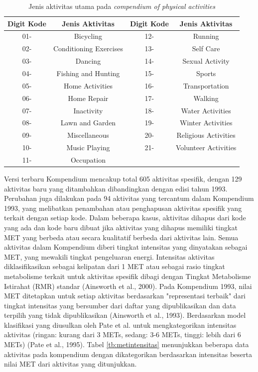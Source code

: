 \begin{longtable}{|c|c|c|c|}
  \caption{Jenis aktivitas utama pada \emph{compendium of physical activities}}
  \label{tb:metjenisaktivitas}  \\
  \hline
  \rowcolor[HTML]{C0C0C0}
  \textbf{Digit Kode} & \textbf{Jenis Aktivitas} & \textbf{Digit Kode} & \textbf{Jenis Aktivitas} \\
  \hline
  01-     & Bicycling                 & 12-    & Running     \\
  \hline
  02-     & Conditioning Exercises    & 13-    & Self Care     \\
  \hline
  03-     & Dancing                   & 14-    & Sexual Activity     \\
  \hline
  04-     & Fishing and Hunting       & 15-    & Sports    \\
  \hline
  05-     & Home Activities           & 16-    & Transportation     \\
  \hline
  06-     & Home Repair               & 17-    & Walking    \\
  \hline
  07-     & Inactivity                & 18-    & Water Activities    \\
  \hline
  08-     & Lawn and Garden           & 19-    & Winter Activities    \\
  \hline
  09-     & Miscellaneous             & 20-    & Religious Activities    \\
  \hline
  10-     & Music Playing             & 21-    & Volunteer Activities    \\
  \hline
  11-     & Occupation                &        &     \\
  \hline
\end{longtable}

Versi terbaru Kompendium mencakup total 605 aktivitas spesifik, dengan 129 aktivitas baru yang ditambahkan dibandingkan dengan edisi tahun 1993. Perubahan juga dilakukan pada 94 aktivitas yang tercantum dalam Kompendium 1993, yang melibatkan penambahan atau penghapusan aktivitas spesifik yang terkait dengan setiap kode. Dalam beberapa kasus, aktivitas dihapus dari kode yang ada dan kode baru dibuat jika aktivitas yang dihapus memiliki tingkat MET yang berbeda atau secara kualitatif berbeda dari aktivitas lain. Semua aktivitas dalam Kompendium diberi tingkat intensitas yang dinyatakan sebagai MET, yang mewakili tingkat pengeluaran energi. Intensitas aktivitas diklasifikasikan sebagai kelipatan dari 1 MET atau sebagai rasio tingkat metabolisme terkait untuk aktivitas spesifik dibagi dengan Tingkat Metabolisme Istirahat (RMR) standar (Ainsworth et al., 2000). Pada Kompendium 1993, nilai MET ditetapkan untuk setiap aktivitas berdasarkan "representasi terbaik" dari tingkat intensitas yang bersumber dari daftar yang dipublikasikan dan data terpilih yang tidak dipublikasikan (Ainsworth et al., 1993).  Berdasarkan model klasifikasi yang diusulkan oleh Pate et al. untuk mengkategorikan intensitas aktivitas (ringan: kurang dari 3 METs, sedang: 3-6 METs, tinggi: lebih dari 6 METs) (Pate et al., 1995). Tabel \ref{tb:metintensitas} menunjukkan beberapa data aktivitas pada kompendium dengan dikategorikan berdasarkan intensitas beserta nilai MET dari aktivitas yang ditunjukkan.

